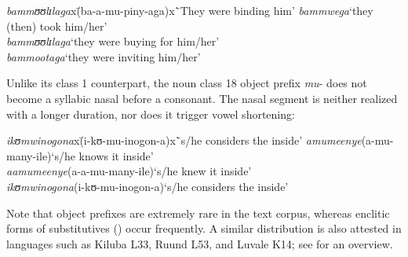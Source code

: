 \begin{exe}
	\ex \label{exOMNCL1Vowel}
	\begin{tabbing}
		\textit{bammʊʊlɪlaga}x\=(\degree ba-a-mu-piny-aga)x\=`They were binding him'\kill
		\textit{bammwega}\> [β̝a.ˈmːʷɛˑ.ɰa]\>`they (then) took him/her'\\
		\textit{bammʊʊlɪlaga}\>`they were buying for him/her'\\ 
		\textit{bammootaga}\>`they were inviting him/her'
	\end{tabbing}
\end{exe}

Unlike its class 1 counterpart, the noun class 18 object prefix \textit{mu}- does not become a syllabic nasal before a consonant. The nasal segment is neither realized with a longer duration, nor does it trigger vowel shortening:
\begin{exe}
	\ex
	\begin{tabbing}
		\textit{ikʊmwinogona}x\=(\degree i-kʊ-mu-inogon-a)x\=`s/he considers the inside'\kill
		\textit{amumeenye}\>(\degree a-mu-many-ile)\>`s/he knows it inside'
		\\\textit{aamumeenye}\>(\degree a-a-mu-many-ile)\>`s/he knew it inside'
		\\\textit{ikʊmwinogona}\>(\degree i-kʊ-mu-inogon-a)\>`s/he considers the inside'
	\end{tabbing}
\end{exe}

Note that  object prefixes are extremely rare in the text corpus, whereas enclitic forms of  substitutives () occur frequently. A similar distribution is also attested in languages such as Kiluba L33, Ruund L53, and Luvale K14; see \citet{DevosMPersohnB2017} for an overview. 
